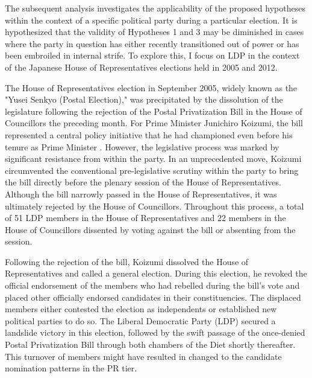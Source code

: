 \documentclass[a4paper, 11pt]{article}
\begin{document}
The subsequent analysis investigates the applicability of the proposed hypotheses within the context of a specific political party during a particular election. It is hypothesized that the validity of Hypotheses 1 and 3 may be diminished in cases where the party in question has either recently transitioned out of power or has been embroiled in internal strife. To explore this, I focus on LDP in the context of the Japanese House of Representatives elections held in 2005 and 2012.

The House of Representatives election in September 2005, widely known as the "Yusei Senkyo (Postal Election)," was precipitated by the dissolution of the legislature following the rejection of the Postal Privatization Bill in the House of Councillors the preceding month. For Prime Minister Junichiro Koizumi, the bill represented a central policy initiative that he had championed even before his tenure as Prime Minister \citep{uchiyama_2007}. However, the legislative process was marked by significant resistance from within the party. In an unprecedented move, Koizumi circumvented the conventional pre-legislative scrutiny within the party to bring the bill directly before the plenary session of the House of Representatives.\footnotemark{} Although the bill narrowly passed in the House of Representatives, it was ultimately rejected by the House of Councillors. Throughout this process, a total of 51 LDP members in the House of Representatives and 22 members in the House of Councillors dissented by voting against the bill or absenting from the session. 


Following the rejection of the bill, Koizumi dissolved the House of Representatives and called a general election. During this election, he revoked the official endorsement of the members who had rebelled during the bill's vote and placed other officially endorsed candidates in their constituencies. The displaced members either contested the election as independents or established new political parties to do so. The Liberal Democratic Party (LDP) secured a landslide victory in this election, followed by the swift passage of the once-denied Postal Privatization Bill through both chambers of the Diet shortly thereafter. This turnover of members might have resulted in changed to the candidate nomination patterns in the PR tier. 
\end{document}
